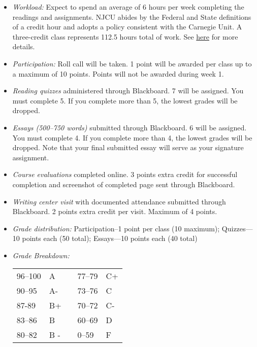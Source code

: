 \documentclass[article,oneside]{memoir}
\begin{document}
\begin{itemize}
\item \textit{Workload:} Expect to spend an average of 6 hours per week completing the readings and assignments. NJCU abides by the Federal and State definitions of a credit hour and adopts a policy consistent with the Carnegie Unit. A three-credit class represents 112.5 hours total of work. See \href{http://scottoconnor.org/resources/Credit.pdf}{here} for more details.

\item \textit{Participation:} Roll call will be taken. 1 point will be awarded per class up to a maximum of 10 points. Points will not be awarded during week 1.

\item \textit{Reading quizzes} administered through Blackboard. 7 will be assigned. You must complete 5. If you complete more than 5, the lowest grades will be dropped. 


\item \textit{Essays (500--750 words)} submitted through Blackboard.  6 will be assigned. You must complete 4. If you complete more than 4, the lowest grades will be dropped. Note that your final submitted essay will serve as your signature assignment.

\item \textit{Course evaluations} completed online. 3 points extra credit for successful completion  and screenshot of completed page sent through Blackboard. 

\item \textit{Writing center visit} with documented attendance submitted through Blackboard. 2 points extra credit per visit. Maximum of 4 points.  
  
\item \textit{Grade distribution:} Participation--1 point per class (10 maximum); Quizzes---10 points each (50 total);  Essays---10 points each (40 total)


\item \textit{Grade Breakdown:}

 \begin{tabular}{ | l | l | p{2cm} | l | l | }
    \hline 
96--100 & A  & &  77--79 &  C+ \\  
90--95 & A- & &  73--76 & C \\
87-89 & B+ &  &  70--72 & C- \\ 
83--86 & B  & &  60--69 & D\\
80--82 & B - & & 0--59 & F\\ \hline
    \end{tabular}


\end{itemize}
\end{document}
